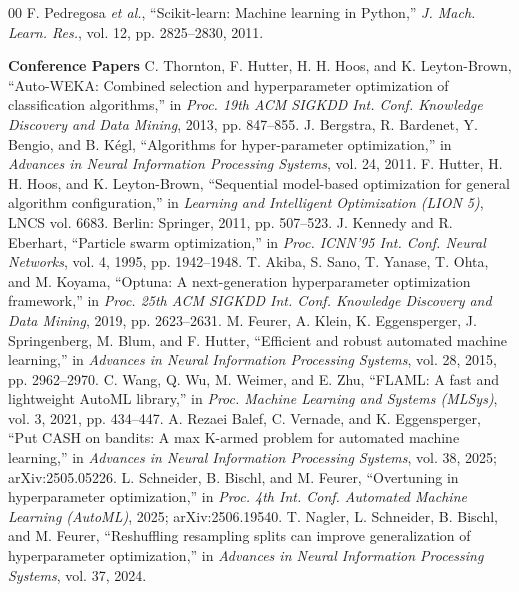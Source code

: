 \documentclass[conference]{IEEEtran}
\begin{document}
\begin{thebibliography}{00}
 F. Pedregosa \textit{et al.}, ``Scikit-learn: Machine learning in Python,'' \textit{J. Mach. Learn. Res.}, vol. 12, pp. 2825--2830, 2011.
\item[] \textbf{Conference Papers}
 C. Thornton, F. Hutter, H. H. Hoos, and K. Leyton-Brown, ``Auto-WEKA: Combined selection and hyperparameter optimization of classification algorithms,'' in \textit{Proc. 19th ACM SIGKDD Int. Conf. Knowledge Discovery and Data Mining}, 2013, pp. 847--855.
 J. Bergstra, R. Bardenet, Y. Bengio, and B. K{\'e}gl, ``Algorithms for hyper-parameter optimization,'' in \textit{Advances in Neural Information Processing Systems}, vol. 24, 2011.
 F. Hutter, H. H. Hoos, and K. Leyton-Brown, ``Sequential model-based optimization for general algorithm configuration,'' in \textit{Learning and Intelligent Optimization (LION 5)}, LNCS vol. 6683. Berlin: Springer, 2011, pp. 507--523.
 J. Kennedy and R. Eberhart, ``Particle swarm optimization,'' in \textit{Proc. ICNN'95 Int. Conf. Neural Networks}, vol. 4, 1995, pp. 1942--1948.
 T. Akiba, S. Sano, T. Yanase, T. Ohta, and M. Koyama, ``Optuna: A next-generation hyperparameter optimization framework,'' in \textit{Proc. 25th ACM SIGKDD Int. Conf. Knowledge Discovery and Data Mining}, 2019, pp. 2623--2631.
 M. Feurer, A. Klein, K. Eggensperger, J. Springenberg, M. Blum, and F. Hutter, ``Efficient and robust automated machine learning,'' in \textit{Advances in Neural Information Processing Systems}, vol. 28, 2015, pp. 2962--2970.
 C. Wang, Q. Wu, M. Weimer, and E. Zhu, ``FLAML: A fast and lightweight AutoML library,'' in \textit{Proc. Machine Learning and Systems (MLSys)}, vol. 3, 2021, pp. 434--447.
 A. Rezaei Balef, C. Vernade, and K. Eggensperger, ``Put CASH on bandits: A max K-armed problem for automated machine learning,'' in \textit{Advances in Neural Information Processing Systems}, vol. 38, 2025; arXiv:2505.05226.
 L. Schneider, B. Bischl, and M. Feurer, ``Overtuning in hyperparameter optimization,'' in \textit{Proc. 4th Int. Conf. Automated Machine Learning (AutoML)}, 2025; arXiv:2506.19540.
 T. Nagler, L. Schneider, B. Bischl, and M. Feurer, ``Reshuffling resampling splits can improve generalization of hyperparameter optimization,'' in \textit{Advances in Neural Information Processing Systems}, vol. 37, 2024.

\end{thebibliography}
\end{document}
